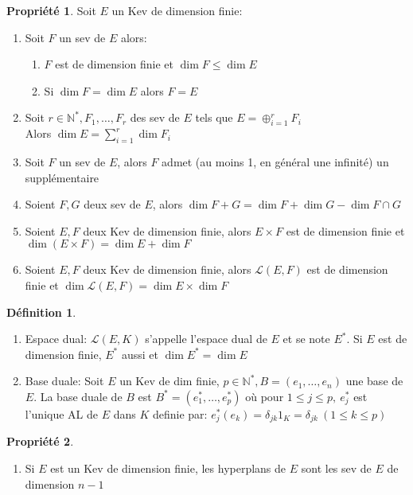 \documentclass[fleqn]{article}
\theoremstyle{definition} \newtheorem*{defi}{D\'efinition}
\theoremstyle{definition} \newtheorem*{theo}{Th\'eor\`eme}
\theoremstyle{definition} \newtheorem*{coro}{Corollaire}
\theoremstyle{definition} \newtheorem*{nota}{Notation}
\theoremstyle{remark} \newtheorem*{rqs}{Remarques}
\theoremstyle{definition} \newtheorem*{prop}{Propri\'et\'e}
\begin{document}
\begin{prop} Soit $E$ un Kev de dimension finie:
	\begin{enumerate}
		\item Soit $F$ un sev de $E$ alors:
			\begin{enumerate}
				\item $F$ est de dimension finie et $\dim F \leq \dim E$
				\item Si $\dim F = \dim E$ alors $F=E$
			\end{enumerate}
		\item Soit $r \in \mathbb{N}^*, F_1, \hdots, F_r$ des sev de $E$ tels que $E = \oplus_{i=1}^r F_i$\\
			Alors $\dim E = \sum_{i=1}^r \dim F_i$
		\item Soit $F$ un sev de $E$, alors $F$ admet (au moins 1, en g\'en\'eral une infinit\'e) un suppl\'ementaire
		\item Soient $F,G$ deux sev de $E$, alors $\dim F+G = \dim F + \dim G - \dim F \cap G$
		\item Soient $E,F$ deux Kev de dimension finie, alors $E\times F$ est de dimension finie et $\dim (E\times F) = \dim E + \dim F$
		\item Soient $E,F$ deux Kev de dimension finie, alors $\mathscr{L}(E,F)$ est de dimension finie et $\dim \mathscr{L}(E,F) = \dim E
			\times \dim F$
	\end{enumerate}
\end{prop}

\begin{defi} $ $
	\begin{enumerate}
		\item Espace dual: $\mathscr{L}(E,K)$ s'appelle l'espace dual de $E$ et se note $E^*$. Si $E$ est de dimension finie, $E^*$
			aussi et $\dim E^* = \dim E$
		\item Base duale: Soit $E$ un Kev de dim finie, $p \in \mathbb{N}^*, B = (e_1, \hdots, e_n)$ une base de $E$. La base duale de $B$
			est $B^* = (e_1^*, \hdots, e_p^*)$ o\`u pour $1 \leq j \leq p,\ e_j^*$ est l'unique AL de $E$ dans $K$ definie par:
			$e_j^*(e_k) = \delta_{jk} 1_K = \delta_{jk}\ (1 \leq k \leq p)$
	\end{enumerate}
\end{defi}

\begin{prop} $ $
	\begin{enumerate}
		\item Si $E$ est un Kev de dimension finie, les hyperplans de $E$ sont les sev de $E$ de dimension $n-1$
	\end{enumerate}
\end{prop}
\end{document}
